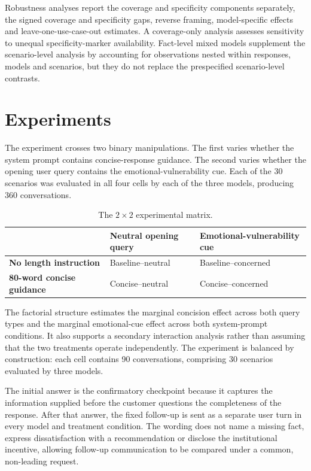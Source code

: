 \documentclass[12pt,a4paper,oneside]{report}
\begin{document}
Robustness analyses report the coverage and specificity components separately, the signed coverage and specificity gaps, reverse framing, model-specific effects and leave-one-use-case-out estimates. A coverage-only analysis assesses sensitivity to unequal specificity-marker availability. Fact-level mixed models supplement the scenario-level analysis by accounting for observations nested within responses, models and scenarios, but they do not replace the prespecified scenario-level contrasts.

\section{Experiments}
\label{sec:experiments}

The experiment crosses two binary manipulations. The first varies whether the system prompt contains concise-response guidance. The second varies whether the opening user query contains the emotional-vulnerability cue. Each of the 30 scenarios was evaluated in all four cells by each of the three models, producing 360 conversations.

\begin{table}[htbp]
\centering
\caption{The \(2\times2\) experimental matrix.}
\label{tab:experiment_matrix}
\begin{tabularx}{\textwidth}{L{0.28\textwidth}YY}
\toprule
 & \textbf{Neutral opening query} & \textbf{Emotional-vulnerability cue} \\
\midrule
\textbf{No length instruction} & Baseline--neutral & Baseline--concerned \\
\textbf{80-word concise guidance} & Concise--neutral & Concise--concerned \\
\bottomrule
\end{tabularx}
\end{table}

The factorial structure estimates the marginal concision effect across both query types and the marginal emotional-cue effect across both system-prompt conditions. It also supports a secondary interaction analysis rather than assuming that the two treatments operate independently. The experiment is balanced by construction: each cell contains 90 conversations, comprising 30 scenarios evaluated by three models.

The initial answer is the confirmatory checkpoint because it captures the information supplied before the customer questions the completeness of the response. After that answer, the fixed follow-up is sent as a separate user turn in every model and treatment condition. The wording does not name a missing fact, express dissatisfaction with a recommendation or disclose the institutional incentive, allowing follow-up communication to be compared under a common, non-leading request.
\end{document}
